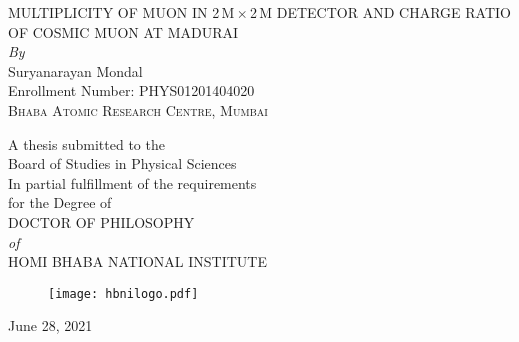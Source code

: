 \begin{center}

  \onehalfspacing
  
  \huge
  \vspace*{0.2em}
  \uppercase{Multiplicity of muon in 2\,m\,$\times$\,2\,m detector and charge ratio of cosmic muon at Madurai}\\
  
  \large
  \vspace*{3em}\textit{By}\\
  Suryanarayan Mondal\\
  Enrollment Number: PHYS01201404020\\
  
  \Large
  \vspace*{0.5em}
  \textsc{Bhaba Atomic Research Centre, Mumbai}
  
  \singlespacing
  \large

  \vspace*{1.em}
  A thesis submitted to the\\
  Board of Studies in Physical Sciences\\
  \vspace*{1em}
  In partial fulfillment of the requirements\\
  for the Degree of\\
  
  \doublespacing
  \vspace*{1em}
  \uppercase{Doctor of Philosophy}\\
  \textit{of}\\
  \uppercase{Homi Bhaba National Institute}
  
  \vspace*{1em}
  \begin{figure}[h!]
    \centering
    \texttt{[image: hbnilogo.pdf]}
  \end{figure}
  
  June 28, 2021
  
\end{center}
